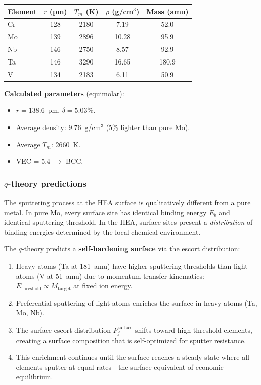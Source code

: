\documentclass[12pt,letterpaper]{article}
\theoremstyle{definition}
\begin{document}
\begin{center}
\begin{tabular}{@{}lcccc@{}}
\toprule
Element & $r$ (pm) & $T_m$ (K) & $\rho$ (g/cm$^3$) & Mass (amu) \\
\midrule
Cr & 128 & 2180 & 7.19  & 52.0 \\
Mo & 139 & 2896 & 10.28 & 95.9 \\
Nb & 146 & 2750 & 8.57  & 92.9 \\
Ta & 146 & 3290 & 16.65 & 180.9 \\
V  & 134 & 2183 & 6.11  & 50.9 \\
\bottomrule
\end{tabular}
\end{center}

\textbf{Calculated parameters} (equimolar):
\begin{itemize}
  \item $\bar{r} = 138.6$~pm, \quad $\delta = 5.03\%$.
  \item Average density: 9.76~g/cm$^3$ \quad (5\% lighter than pure Mo).
  \item Average $T_m$: 2660~K.
  \item VEC = 5.4 $\to$ BCC.
\end{itemize}

\subsubsection{$q$-theory predictions}

The sputtering process at the HEA surface is qualitatively different from a pure metal.  In pure Mo, every surface site has identical binding energy $E_b$ and identical sputtering threshold.  In the HEA, surface sites present a \emph{distribution} of binding energies determined by the local chemical environment.

The $q$-theory predicts a \textbf{self-hardening surface} via the escort distribution:

\begin{enumerate}
  \item Heavy atoms (Ta at 181~amu) have higher sputtering thresholds than light atoms (V at 51~amu) due to momentum transfer kinematics: $E_{\mathrm{threshold}} \propto M_{\mathrm{target}}$ at fixed ion energy.
  \item Preferential sputtering of light atoms enriches the surface in heavy atoms (Ta, Mo, Nb).
  \item The surface escort distribution $P_j^{\mathrm{surface}}$ shifts toward high-threshold elements, creating a surface composition that is self-optimized for sputter resistance.
  \item This enrichment continues until the surface reaches a steady state where all elements sputter at equal rates---the surface equivalent of economic equilibrium.
\end{enumerate}
\end{document}
